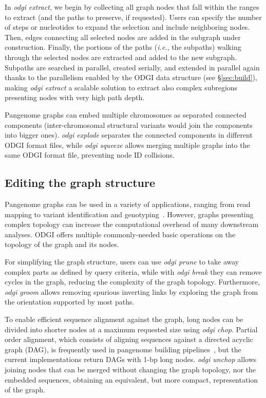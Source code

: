 \documentclass{bioinfo}
\begin{document}
In \textit{odgi extract}, we begin by collecting all graph nodes that fall within the ranges to extract (and the paths to preserve, if requested).
Users can specify the number of steps or nucleotides to expand the selection and include neighboring nodes.
Then, edges connecting all selected nodes are added in the subgraph under construction.
Finally, the portions of the paths (\textit{i.e.}, the subpaths) walking through the selected nodes are extracted and added to the new subgraph.
Subpaths are searched in parallel, created serially, and extended in parallel again thanks to the parallelism enabled by the ODGI data structure (see \S\ref{sec:build}), making \textit{odgi extract} a scalable solution to extract also complex subregions presenting nodes with very high path depth.


Pangenome graphs can embed multiple chromosomes as separated connected components (inter-chromosomal structural variants would join the components into bigger ones).
\textit{odgi explode} separates the connected components in different ODGI format files, while \textit{odgi squeeze} allows merging multiple graphs into the same ODGI format file, preventing node ID collisions.


\subsection{Editing the graph structure}
\label{sec:edit}

Pangenome graphs can be used in a variety of applications, ranging from read mapping to variant identification and genotyping~\citep{Eizenga_2020}.
However, graphs presenting complex topology can increase the computational overhead of many downstream analyses.
ODGI offers multiple commonly-needed basic operations on the topology of the graph and its nodes.

For simplifying the graph structure, users can use \textit{odgi prune} to take away complex parts as defined by query criteria,
while with \textit{odgi break} they can remove cycles in the graph, reducing the complexity of the graph topology.
Furthermore, \textit{odgi groom} allows removing spurious inverting links by exploring the graph from the orientation supported by most paths.

To enable efficient sequence alignment against the graph, long nodes can be divided into shorter nodes at a maximum requested size using \textit{odgi chop}.
Partial order alignment, which consists of aligning sequences against a directed acyclic graph (DAG), is frequently used in pangenome building pipelines~\citep{pggb}, but the current implementations return DAGs with 1-bp long nodes.
\textit{odgi unchop} allows joining nodes that can be merged without changing the graph topology, nor the embedded sequences, obtaining an equivalent, but more compact, representation of the graph.
\end{document}
